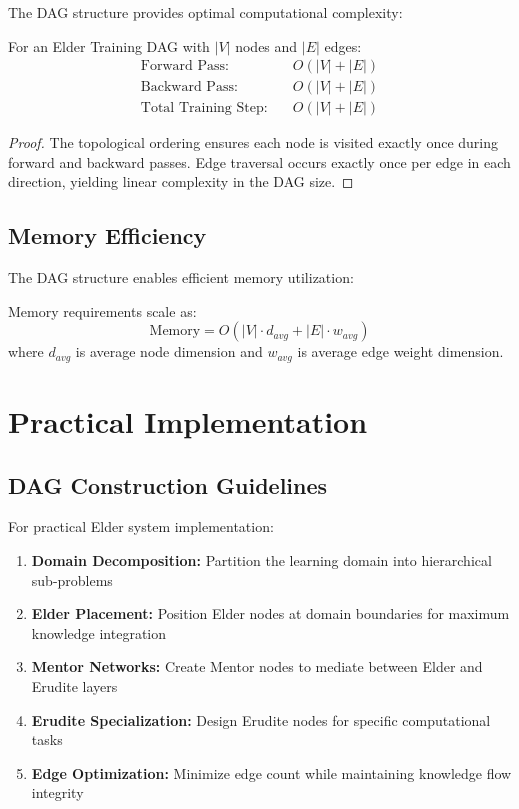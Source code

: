 The DAG structure provides optimal computational complexity:

\begin{theorem}
For an Elder Training DAG with $|V|$ nodes and $|E|$ edges:
\begin{align}
\text{Forward Pass:} &\quad O(|V| + |E|) \\
\text{Backward Pass:} &\quad O(|V| + |E|) \\
\text{Total Training Step:} &\quad O(|V| + |E|)
\end{align}
\end{theorem}

\begin{proof}
The topological ordering ensures each node is visited exactly once during forward and backward passes. Edge traversal occurs exactly once per edge in each direction, yielding linear complexity in the DAG size.
\end{proof}

\subsection{Memory Efficiency}

The DAG structure enables efficient memory utilization:

\begin{lemma}
Memory requirements scale as:
\begin{equation}
\text{Memory} = O(|V| \cdot d_{avg} + |E| \cdot w_{avg})
\end{equation}
where $d_{avg}$ is average node dimension and $w_{avg}$ is average edge weight dimension.
\end{lemma}

\section{Practical Implementation}

\subsection{DAG Construction Guidelines}

For practical Elder system implementation:

\begin{enumerate}
    \item \textbf{Domain Decomposition:} Partition the learning domain into hierarchical sub-problems
    \item \textbf{Elder Placement:} Position Elder nodes at domain boundaries for maximum knowledge integration
    \item \textbf{Mentor Networks:} Create Mentor nodes to mediate between Elder and Erudite layers
    \item \textbf{Erudite Specialization:} Design Erudite nodes for specific computational tasks
    \item \textbf{Edge Optimization:} Minimize edge count while maintaining knowledge flow integrity
\end{enumerate}

